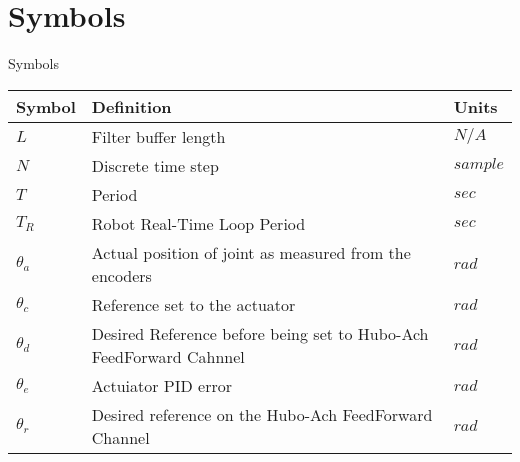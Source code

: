\chapter{Symbols}
\Large
\begin{center}
Symbols\\
\normalsize
\begin{longtable}{p{} | p{} | p{}}
\hline
Symbol     & Definition                                                         & Units \\
\hline
$L$        & Filter buffer length                                               & $N/A$\\
\hline
$N$        & Discrete time step                                                 & $sample$\\
\hline
$T$        & Period                                                             & $sec$ \\
\hline
$T_R$        & Robot Real-Time Loop Period                                      & $sec$ \\
\hline
$\theta_a$ & Actual position of joint as measured from the encoders             & $rad$ \\
\hline
$\theta_c$ & Reference set to the actuator                                      & $rad$ \\
\hline
$\theta_d$ & Desired Reference before being set to Hubo-Ach FeedForward Cahnnel & $rad$ \\
\hline
$\theta_e$ & Actuiator PID error                                                & $rad$ \\
\hline
$\theta_r$ & Desired reference on the Hubo-Ach FeedForward Channel              & $rad$ \\
\hline

\end{longtable}
\end{center}